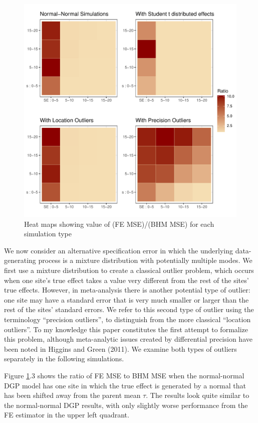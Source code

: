 \documentclass[12pt]{article}
\begin{document}
\begin{figure}
\centering
\includegraphics[scale=0.8]{heatmap_plots.pdf}
\caption{Heat maps showing value of (FE MSE)/(BHM MSE) for each simulation type}
\label{heatmaps}
\end{figure}

We now consider an alternative specification error in which the underlying data-generating process is a mixture distribution with potentially multiple modes. We first use a mixture distribution to create a classical outlier problem, which occurs when one site's true effect takes a value very different from the rest of the sites' true effects. However, in meta-analysis there is another potential type of outlier: one site may have a standard error that is very much smaller or larger than the rest of the sites' standard errors. We refer to this second type of outlier using the terminology ``precision outliers'', to distinguish from the more classical ``location outliers''. To my knowledge this paper constitutes the first attempt to formalize this problem, although meta-analytic issues created by differential precision have been noted in Higgins and Green (2011). We examine both types of outliers separately in the following simulations. 

Figure \ref{heatmaps}.3 shows the ratio of FE MSE to BHM MSE when the normal-normal DGP model has one site in which the true effect is generated by a normal that has been shifted away from the parent mean $\tau$. The results look quite similar to the normal-normal DGP results, with only slightly worse performance from the FE estimator in the upper left quadrant.
\end{document}
